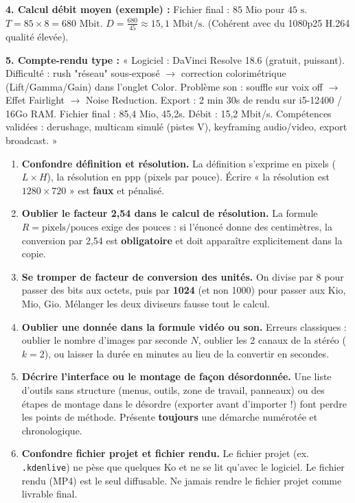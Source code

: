 \documentclass[11pt]{article}
\begin{document}
\begin{corrige}
\textbf{4. Calcul débit moyen (exemple) :}
Fichier final : $85 \text{ Mio}$ pour $45 \text{ s}$.
$T = 85 \times 8 = 680 \text{ Mbit}$.
$D = \frac{680}{45} \approx 15,1 \text{ Mbit/s}$.
(Cohérent avec du 1080p25 H.264 qualité élevée).

\textbf{5. Compte-rendu type :}
« Logiciel : DaVinci Resolve 18.6 (gratuit, puissant). Difficulté : rush "réseau" sous-exposé $\to$ correction colorimétrique (Lift/Gamma/Gain) dans l'onglet Color. Problème son : souffle sur voix off $\to$ Effet Fairlight $\to$ Noise Reduction. Export : 2 min 30s de rendu sur i5-12400 / 16Go RAM. Fichier final : 85,4 Mio, 45,2s. Débit : 15,2 Mbit/s. Compétences validées : derushage, multicam simulé (pistes V), keyframing audio/video, export broadcast. »
\end{corrige}

\begin{attention}
\begin{enumerate}
  \item \textbf{Confondre définition et résolution.} La définition s'exprime en pixels ($L \times H$), la résolution en ppp (pixels par pouce). Écrire « la résolution est $1280 \times 720$ » est \textbf{faux} et pénalisé.
  \item \textbf{Oublier le facteur 2,54 dans le calcul de résolution.} La formule $R = \text{pixels}/\text{pouces}$ exige des pouces : si l'énoncé donne des centimètres, la conversion par 2,54 est \textbf{obligatoire} et doit apparaître explicitement dans la copie.
  \item \textbf{Se tromper de facteur de conversion des unités.} On divise par 8 pour passer des bits aux octets, puis par \textbf{1024} (et non 1000) pour passer aux Kio, Mio, Gio. Mélanger les deux diviseurs fausse tout le calcul.
  \item \textbf{Oublier une donnée dans la formule vidéo ou son.} Erreurs classiques : oublier le nombre d'images par seconde $N$, oublier les 2 canaux de la stéréo ($k=2$), ou laisser la durée en minutes au lieu de la convertir en secondes.
  \item \textbf{Décrire l'interface ou le montage de façon désordonnée.} Une liste d'outils sans structure (menus, outils, zone de travail, panneaux) ou des étapes de montage dans le désordre (exporter avant d'importer !) font perdre les points de méthode. Présente \textbf{toujours} une démarche numérotée et chronologique.
  \item \textbf{Confondre fichier projet et fichier rendu.} Le fichier projet (ex. \texttt{.kdenlive}) ne pèse que quelques Ko et ne se lit qu'avec le logiciel. Le fichier rendu (MP4) est le seul diffusable. Ne jamais rendre le fichier projet comme livrable final.
\end{enumerate}
\end{attention}
\end{document}
